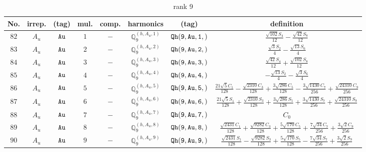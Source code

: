 \documentclass[fleqn,8pt]{jsarticle}
\begin{document}
\begin{table}[ht!]
\begin{center}
\caption{rank 9}
\renewcommand{\arraystretch}{1.3}
\begin{tabular}{cccccccc} \hline \hline
No. & irrep. & (tag) & mul. & comp. & harmonics & (tag) & definition \\ \hline
$ 82 $ & $ A_{u} $ & $ {\tt Au} $ & $ 1 $ & $ - $ & $ \mathbb{Q}_{9}^{(h,A_{u},1)} $ & $ {\tt Qh(9,Au,1,)} $ & $ \frac{\sqrt{102} S_{4}}{12} - \frac{\sqrt{42} S_{8}}{12} $ \\
$ 83 $ & $ A_{u} $ & $ {\tt Au} $ & $ 2 $ & $ - $ & $ \mathbb{Q}_{9}^{(h,A_{u},2)} $ & $ {\tt Qh(9,Au,2,)} $ & $ \frac{\sqrt{3} S_{2}}{4} - \frac{\sqrt{13} S_{6}}{4} $ \\
$ 84 $ & $ A_{u} $ & $ {\tt Au} $ & $ 3 $ & $ - $ & $ \mathbb{Q}_{9}^{(h,A_{u},3)} $ & $ {\tt Qh(9,Au,3,)} $ & $ \frac{\sqrt{42} S_{4}}{12} + \frac{\sqrt{102} S_{8}}{12} $ \\
$ 85 $ & $ A_{u} $ & $ {\tt Au} $ & $ 4 $ & $ - $ & $ \mathbb{Q}_{9}^{(h,A_{u},4)} $ & $ {\tt Qh(9,Au,4,)} $ & $ - \frac{\sqrt{13} S_{2}}{4} - \frac{\sqrt{3} S_{6}}{4} $ \\
$ 86 $ & $ A_{u} $ & $ {\tt Au} $ & $ 5 $ & $ - $ & $ \mathbb{Q}_{9}^{(h,A_{u},5)} $ & $ {\tt Qh(9,Au,5,)} $ & $ \frac{21 \sqrt{5} C_{1}}{128} - \frac{\sqrt{2310} C_{3}}{128} + \frac{3 \sqrt{286} C_{5}}{128} - \frac{3 \sqrt{1430} C_{7}}{256} + \frac{\sqrt{24310} C_{9}}{256} $ \\
$ 87 $ & $ A_{u} $ & $ {\tt Au} $ & $ 6 $ & $ - $ & $ \mathbb{Q}_{9}^{(h,A_{u},6)} $ & $ {\tt Qh(9,Au,6,)} $ & $ \frac{21 \sqrt{5} S_{1}}{128} + \frac{\sqrt{2310} S_{3}}{128} + \frac{3 \sqrt{286} S_{5}}{128} + \frac{3 \sqrt{1430} S_{7}}{256} + \frac{\sqrt{24310} S_{9}}{256} $ \\
$ 88 $ & $ A_{u} $ & $ {\tt Au} $ & $ 7 $ & $ - $ & $ \mathbb{Q}_{9}^{(h,A_{u},7)} $ & $ {\tt Qh(9,Au,7,)} $ & $ C_{0} $ \\
$ 89 $ & $ A_{u} $ & $ {\tt Au} $ & $ 8 $ & $ - $ & $ \mathbb{Q}_{9}^{(h,A_{u},8)} $ & $ {\tt Qh(9,Au,8,)} $ & $ \frac{\sqrt{2431} C_{1}}{128} + \frac{\sqrt{9282} C_{3}}{128} + \frac{5 \sqrt{170} C_{5}}{128} + \frac{7 \sqrt{34} C_{7}}{256} + \frac{3 \sqrt{2} C_{9}}{256} $ \\
$ 90 $ & $ A_{u} $ & $ {\tt Au} $ & $ 9 $ & $ - $ & $ \mathbb{Q}_{9}^{(h,A_{u},9)} $ & $ {\tt Qh(9,Au,9,)} $ & $ \frac{\sqrt{2431} S_{1}}{128} - \frac{\sqrt{9282} S_{3}}{128} + \frac{5 \sqrt{170} S_{5}}{128} - \frac{7 \sqrt{34} S_{7}}{256} + \frac{3 \sqrt{2} S_{9}}{256} $ \\

\end{tabular}
\end{center}
\end{table}
\end{document}
